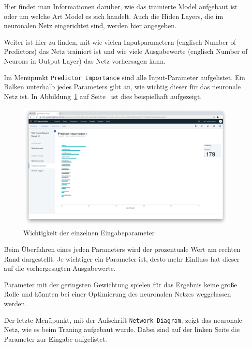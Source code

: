 Hier findet man Informationen darüber, wie das trainierte Model aufgebaut ist oder um welche Art Model es sich handelt.
Auch die Hiden Layers, die im neuronalen Netz eingerichtet sind, werden hier angegeben.

Weiter ist hier zu finden, mit wie vielen Inputparametern (englisch Number of Predictors) das Netz trainiert ist und wie
viele Ausgabewerte (englisch Number of Neurons in Output Layer) das Netz vorhersagen kann.

Im Menüpunkt \texttt{Predictor Importance} sind alle Input-Parameter aufgelistet. Ein Balken unterhalb jedes Parameters
gibt an, wie wichtig dieser für das neuronale Netz ist. In Abbildung~\ref{fig:umsetzung_model_predictor} auf
Seite~\pageref{fig:umsetzung_model_predictor} ist dies beispielhaft aufgezeigt.

\begin{figure}[h]
    \centering
    \includegraphics[width=\textwidth]{images/kapitel_3/model_predictor.png}
    \caption{Wichtigkeit der einzelnen Eingabeparameter}
    \label{fig:umsetzung_model_predictor}
\end{figure}

Beim Überfahren eines jeden Parameters wird der prozentuale Wert am rechten Rand dargestellt. Je wichtiger ein Parameter
ist, desto mehr Einfluss hat dieser auf die vorhergesagten Ausgabewerte.

Parameter mit der geringsten Gewichtung spielen für das Ergebnis keine große Rolle und könnten bei einer Optimierung des
neuronalen Netzes weggelassen werden.

Der letzte Menüpunkt, mit der Aufschrift \texttt{Network Diagram}, zeigt das neuronale Netz, wie es beim Traning aufgebaut
wurde. Dabei sind auf der linken Seite die Parameter zur Eingabe aufgelistet.


